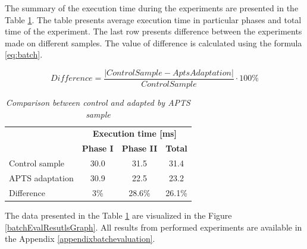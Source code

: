 \documentclass[12pt,a4paper]{article}
\begin{document}
The summary of the execution time during the experiments are presented in the Table \ref{batchCompResutls}. The table presents average execution time in particular phases and total time of the experiment. The last row presents difference between the experiments made on different samples. The value of difference is calculated using the formula \eqref{eq:batch}. 

\begin{equation} \label{eq:batch}
Difference = \frac{|ControlSample - AptsAdaptation|}{ControlSample}\cdot 100\%
\end{equation}


\begin{table}[!htb]
\begin{center}
\begin{tabular}{l|ccc}
                 &  \multicolumn{3}{c}{\textbf{Execution time [ms]}} \\
                 &  \textbf{Phase I } & \textbf{Phase II} & \textbf{Total} \\ \hline
Control sample   &  30.0 & 31.5 & 31.4 \\ 
APTS adaptation  &  30.9 & 22.5 & 23.2 \\ \hline
Difference       &  3\% & 28.6\% & 26.1\% \\ 
\end{tabular}
\end{center}
\caption{\textit{Comparison between control and adapted by APTS sample}} \label{batchCompResutls}
\end{table}

The data presented in the Table \ref{batchCompResutls} are visualized in the Figure \ref{batchEvalResutlsGraph}.  All results from performed experiments are available in the Appendix \ref{appendixbatchevaluation}. 
\end{document}
